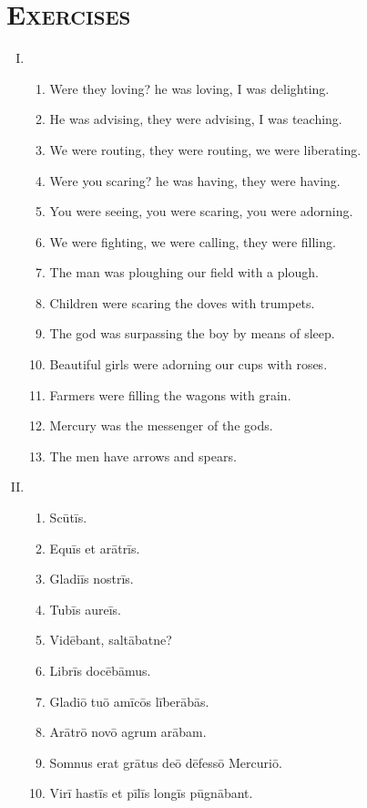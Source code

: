 \documentclass[12pt]{article}
\begin{document}
\section{\textsc{Exercises}}
\begin{enumerate}[I.]
	\setlength{\itemsep}{1em}
	\item \begin{enumerate}[1)]
		\item Were they loving? he was loving, I was delighting.
		\item He was advising, they were advising, I was teaching.
		\item We were routing, they were routing, we were liberating.
		\item Were you scaring? he was having, they were having.
		\item You were seeing, you were scaring, you were adorning.
		\item We were fighting, we were calling, they were filling.
		\item The man was ploughing our field with a plough.
		\item Children were scaring the doves with trumpets.
		\item The god was surpassing the boy by means of sleep.
		\item Beautiful girls were adorning our cups with roses.
		\item Farmers were filling the wagons with grain.
		\item Mercury was the messenger of the gods.
		\item The men have arrows and spears.
	\end{enumerate}
	\item \begin{enumerate}[1)]
		\item Scūtīs.
		\item Equīs et arātrīs.
		\item Gladiīs nostrīs.
		\item Tubīs aureīs.
		\item Vidēbant, saltābatne?
		\item Librīs docēbāmus.
		\item Gladiō tuō amīcōs līberābās.
		\item Arātrō novō agrum arābam.
		\item Somnus erat grātus deō dēfessō Mercuriō.
		\item Virī hastīs et pīlīs longīs pūgnābant.
	\end{enumerate}
\end{enumerate}
\end{document}
